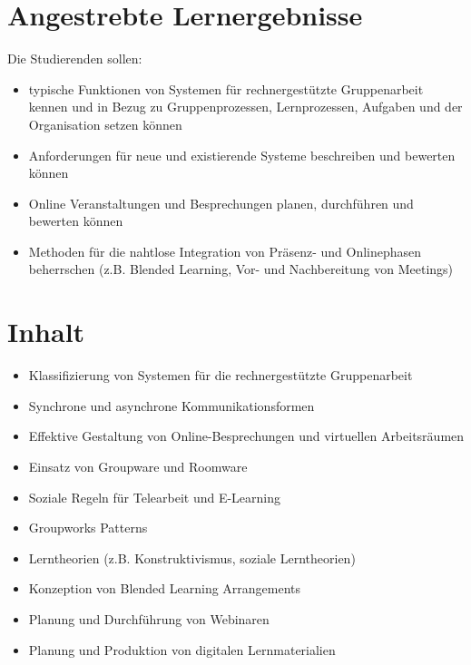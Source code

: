 \section*{Angestrebte
Lernergebnisse\label{/mi-2017/modulbeschreibungen-master/MA_SC_WPF_CSCL}}\label{angestrebte-lernergebnissepathlabelmi-2017modulbeschreibungen-mastermaux5fscux5fwpfux5fcscl}

Die Studierenden sollen:

\begin{itemize}
\tightlist
\item
  typische Funktionen von Systemen für rechnergestützte Gruppenarbeit
  kennen und in Bezug zu Gruppenprozessen, Lernprozessen, Aufgaben und
  der Organisation setzen können
\item
  Anforderungen für neue und existierende Systeme beschreiben und
  bewerten können
\item
  Online Veranstaltungen und Besprechungen planen, durchführen und
  bewerten können
\item
  Methoden für die nahtlose Integration von Präsenz- und Onlinephasen
  beherrschen (z.B. Blended Learning, Vor- und Nachbereitung von
  Meetings)
\end{itemize}

\section*{Inhalt\label{/mi-2017/modulbeschreibungen-master/MA_SC_WPF_CSCL}}\label{inhaltpathlabelmi-2017modulbeschreibungen-mastermaux5fscux5fwpfux5fcscl}

\begin{itemize}
\tightlist
\item
  Klassifizierung von Systemen für die rechnergestützte Gruppenarbeit
\item
  Synchrone und asynchrone Kommunikationsformen
\item
  Effektive Gestaltung von Online-Besprechungen und virtuellen
  Arbeitsräumen
\item
  Einsatz von Groupware und Roomware
\item
  Soziale Regeln für Telearbeit und E-Learning
\item
  Groupworks Patterns
\item
  Lerntheorien (z.B. Konstruktivismus, soziale Lerntheorien)
\item
  Konzeption von Blended Learning Arrangements
\item
  Planung und Durchführung von Webinaren
\item
  Planung und Produktion von digitalen Lernmaterialien
\end{itemize}

